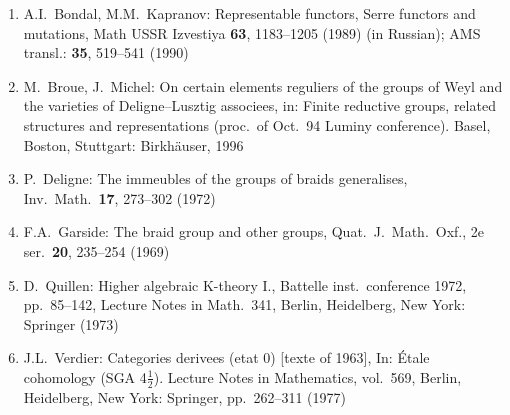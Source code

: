\documentclass[11pt,a4paper]{article}
\theoremstyle{plain}
\theoremstyle{definition}
\begin{document}
\begin{enumerate}[label={}]
\item A.I.\ Bondal, M.M.\ Kapranov: Representable functors, Serre functors and mutations, Math USSR Izvestiya \textbf{63}, 1183--1205 (1989) (in Russian); AMS transl.: \textbf{35}, 519--541 (1990)

\item M.\ Broue, J.\ Michel: On certain elements reguliers of the groups of Weyl and the varieties of Deligne--Lusztig associees, in: Finite reductive groups, related structures and representations (proc.\ of Oct.~94 Luminy conference). Basel, Boston, Stuttgart: Birkh\"auser, 1996

\item P.\ Deligne: The immeubles of the groups of braids generalises, Inv.\ Math.\ \textbf{17}, 273--302 (1972)

\item F.A.\ Garside: The braid group and other groups, Quat.\ J.\ Math.\ Oxf., 2e ser.\ \textbf{20}, 235--254 (1969)

\item D.\ Quillen: Higher algebraic K-theory I., Battelle inst.\ conference 1972, pp.~85--142, Lecture Notes in Math.\ 341, Berlin, Heidelberg, New York: Springer (1973)

\item J.L.\ Verdier: Categories derivees (etat 0) [texte of 1963], In: Étale cohomology (SGA 4$\frac{1}{2}$). Lecture Notes in Mathematics, vol.\ 569, Berlin, Heidelberg, New York: Springer, pp.~262--311 (1977)
\end{enumerate}
\end{document}
